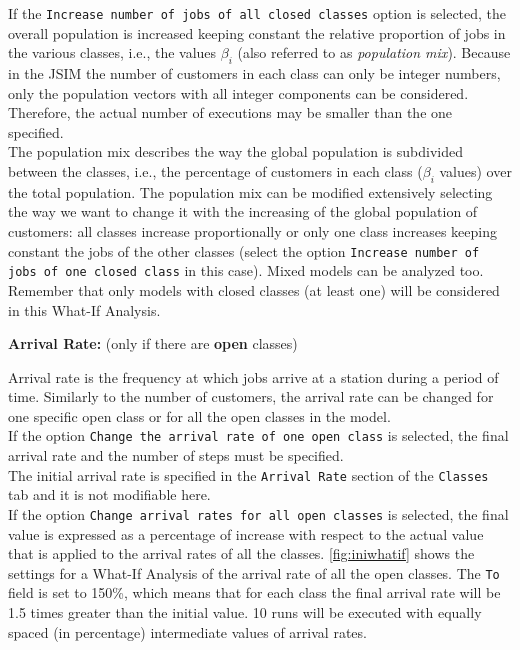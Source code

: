 \begin{itemize*}
If the \texttt{Increase number of jobs of all closed classes}
option is selected, the overall population is increased keeping
constant the relative proportion of jobs in the various classes,
i.e., the values $\beta_i$ (also referred to as \emph{population
mix}). Because in the JSIM the number of customers in each class
can only be integer numbers, only the population vectors with all
integer components can be considered. Therefore, the actual number
of executions may be
smaller than the one specified.\\
The population mix describes the way the global population is
subdivided between the classes, i.e., the percentage of customers
in each class ($\beta_i$ values) over the total population. The
population mix can be modified extensively selecting the way we
want to change it with the increasing of the global population of
customers: all classes increase proportionally or only one class
increases keeping constant the jobs of the other classes (select
the option \texttt{Increase number of jobs of one closed class} in
this case). Mixed models can be analyzed too. Remember that only
models with closed classes (at least one) will be considered in
this What-If Analysis.

\item \textbf{Arrival Rate:} (only if there are \textbf{open}
classes)

Arrival rate is the frequency at which jobs arrive at a station
during a period of time. Similarly to the number of customers, the
arrival rate can be changed for one specific open class or for all
the open classes in the model.\\ If the option \texttt{Change the
arrival rate of one open class} is selected, the final arrival
rate and the number of steps must be specified.\\
The initial arrival rate is specified in the \texttt{Arrival Rate}
section of the \texttt{Classes} tab and it is not modifiable
here.\\
If the option \texttt{Change arrival rates for all open classes}
is selected, the final value is expressed as a percentage of
increase with respect to the actual value that is applied to the
arrival rates of all the classes.
\autoref{fig:iniwhatif} shows the settings for a What-If
Analysis of the arrival rate of all the open classes. The
\texttt{To} field is set to 150\%, which means that for each class
the final arrival rate will be 1.5 times greater than the initial
value. 10 runs will be executed with equally spaced (in
percentage) intermediate values of arrival rates.


\end{itemize*}
